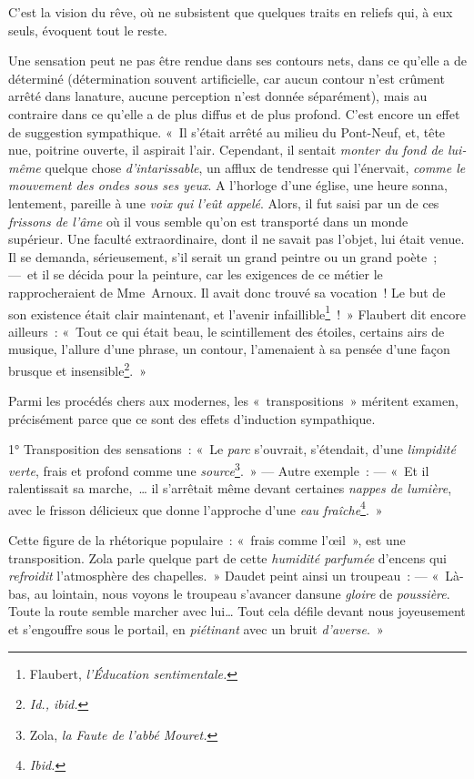 \documentclass[french,twoside]{book} %
\begin{document}
\noindent C’est la vision du rêve, où ne subsistent que quelques traits en reliefs qui, à eux seuls, évoquent tout le reste.\par
Une sensation peut ne pas être rendue dans ses contours nets, dans ce qu’elle a de déterminé (détermination souvent artificielle, car aucun contour n’est crûment arrêté dans lanature, aucune perception n’est donnée séparément), mais au contraire dans ce qu’elle a de plus diffus et de plus profond. C’est encore un effet de suggestion sympathique. « Il s’était arrêté au milieu du Pont-Neuf, et, tête nue, poitrine ouverte, il aspirait l’air. Cependant, il sentait \emph{monter du fond de lui-même} quelque chose \emph{d’intarissable}, un afflux de tendresse qui l’énervait, \emph{comme le mouvement des ondes sous ses yeux}. A l’horloge d’une église, une heure sonna, lentement, pareille à une \emph{voix qui l’eût appelé}. Alors, il fut saisi par un de ces \emph{frissons de l’âme} où il vous semble qu’on est transporté dans un monde supérieur. Une faculté extraordinaire, dont il ne savait pas l’objet, lui était venue. Il se demanda, sérieusement, s’il serait un grand peintre ou un grand poète ; — et il se décida pour la peinture, car les exigences de ce métier le rapprocheraient de Mme Arnoux. Il avait donc trouvé sa vocation ! Le but de son existence était clair maintenant, et l’avenir infaillible\footnote{ Flaubert, \emph{l’Éducation sentimentale.}} ! » Flaubert dit encore ailleurs : « Tout ce qui était beau, le scintillement des étoiles, certains airs de musique, l’allure d’une phrase, un contour, l’amenaient à sa pensée d’une façon brusque et insensible\footnote{\emph{Id., ibid.}}. »\par
Parmi les procédés chers aux modernes, les « transpositions » méritent examen, précisément parce que ce sont des effets d’induction sympathique.\par
1° Transposition des sensations : « Le \emph{parc} s’ouvrait, s’étendait, d’une \emph{limpidité verte}, frais et profond comme une \emph{source}\footnote{ Zola, \emph{la Faute de l’abbé Mouret.}}. » — Autre exemple : — « Et il ralentissait sa marche, … il s’arrêtait même devant certaines \emph{nappes de lumière}, avec le frisson délicieux que donne l’approche d’une \emph{eau fraîche}\footnote{\emph{Ibid.}}. »\par
Cette figure de la rhétorique populaire : « frais comme l’œil », est une transposition. Zola parle quelque part de cette \emph{humidité parfumée} d’encens qui \emph{refroidit} l’atmosphère des chapelles. » Daudet peint ainsi un troupeau : — « Là-bas, au lointain, nous voyons le troupeau s’avancer dansune \emph{gloire} de \emph{poussière}. Toute la route semble marcher avec lui… Tout cela défile devant nous joyeusement et s’engouffre sous le portail, en \emph{piétinant} avec un bruit \emph{d’averse}. »\par
\end{document}
